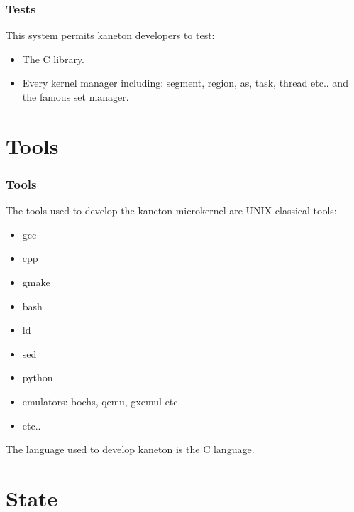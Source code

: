 
\begin{frame}
  \frametitle{Tests}

  This system permits kaneton developers to test:

  \begin{itemize}[<+->]
    \item
      The C library.
    \item
      Every kernel manager including: segment, region, as, task, thread
      etc.. and the famous set manager.
  \end{itemize}
\end{frame}

%
%

\section{Tools}


\begin{frame}
  \frametitle{Tools}

  The tools used to develop the kaneton microkernel are UNIX classical tools:

  \begin{itemize}
    \item
      gcc
    \item
      cpp
    \item
      gmake
    \item
      bash
    \item
      ld
    \item
      sed
    \item
      python
    \item
      emulators: bochs, qemu, gxemul etc..
    \item
      etc..
  \end{itemize}

  \nl

  The language used to develop kaneton is the C language.
\end{frame}

%
%

\section{State}



